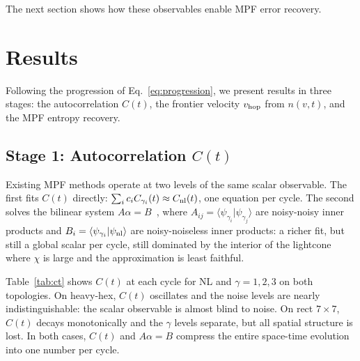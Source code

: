 \documentclass[letterpaper]{article}
\begin{document}
The next section shows how these observables enable MPF error recovery.

\section{Results}
\label{sec:results}

Following the progression of Eq.~\ref{eq:progression}, we present
results in three stages: the autocorrelation $C(t)$, the frontier
velocity $v_{\rm hop}$ from $n(v,t)$, and the MPF entropy recovery.

\subsection{Stage 1: Autocorrelation $C(t)$}

Existing MPF methods operate at two levels of the same scalar observable.
The first fits $C(t)$ directly: $\sum_i c_i C_{\gamma_i}(t) \approx C_{\rm nl}(t)$,
one equation per cycle.
The second solves the bilinear system $A\alpha = B$~\cite{mpf-ref,robertson2026lindbladmultiproductformulas}, where
$A_{ij} = \langle\psi_{\gamma_i}|\psi_{\gamma_j}\rangle$ are noisy-noisy
inner products and $B_i = \langle\psi_{\gamma_i}|\psi_{\rm nl}\rangle$
are noisy-noiseless inner products: a richer fit, but still a global
scalar per cycle, still dominated by the interior of the lightcone
where $\chi$ is large and the approximation is least faithful.

Table~\ref{tab:ct} shows $C(t)$ at each cycle for NL and
$\gamma=1,2,3$ on both topologies.
On heavy-hex, $C(t)$ oscillates and the noise levels are nearly
indistinguishable: the scalar observable is almost blind to noise.
On rect $7\times7$, $C(t)$ decays monotonically and the $\gamma$
levels separate, but all spatial structure is lost.
In both cases, $C(t)$ and $A\alpha=B$ compress the entire
space-time evolution into one number per cycle.
\end{document}
